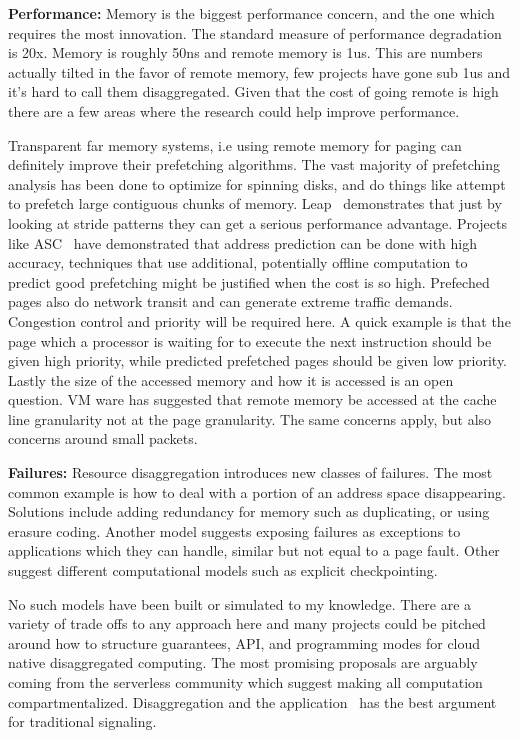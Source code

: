 \textbf{Performance:} Memory is the biggest performance concern, and the one which requires the most
innovation. The standard measure of performance degradation is 20x. Memory is
roughly 50ns and remote memory is 1us. This are numbers actually tilted in the
favor of remote memory, few projects have gone sub 1us and it's hard to call
them disaggregated. Given that the cost of going remote is high there are a few
areas where the research could help improve performance.

Transparent far memory systems, i.e using remote memory for paging can definitely
improve their prefetching algorithms. The vast majority of prefetching analysis
has been done to optimize for spinning disks, and do things like attempt to
prefetch large contiguous chunks of memory. Leap~\cite{leap} demonstrates that
just by looking at stride patterns they can get a serious performance advantage.
Projects like ASC~\cite{asc} have demonstrated that address prediction can be
done with high accuracy, techniques that use additional, potentially offline
computation to predict good prefetching might be justified when the cost is so
high. Prefeched pages also do network transit and can generate extreme traffic
demands. Congestion control and priority will be required here. A quick example
is that the page which a processor is waiting for to execute the next
instruction should be given high priority, while predicted prefetched pages
should be given low priority. Lastly the size of the accessed memory and how it
is accessed is an open question. VM ware has suggested that remote memory be
accessed at the cache line granularity not at the page granularity. The same
concerns apply, but also concerns around small packets.



\textbf{Failures:}
Resource disaggregation introduces new classes of failures. The most common
example is how to deal with a portion of an address space disappearing.
Solutions include adding redundancy for memory such as duplicating, or using
erasure coding. Another model suggests exposing failures as exceptions to
applications which they can handle, similar but not equal to a page fault. Other
suggest different computational models such as explicit checkpointing. 

No such models have been built or simulated to my knowledge. There are a variety
of trade offs to any approach here and many projects could be pitched around how
to structure guarantees, API, and programming modes for cloud native
disaggregated computing. The most promising proposals are arguably coming from
the serverless community which suggest making all computation compartmentalized.
Disaggregation and the application~\cite{ddcaps} has the best argument for
traditional signaling.

